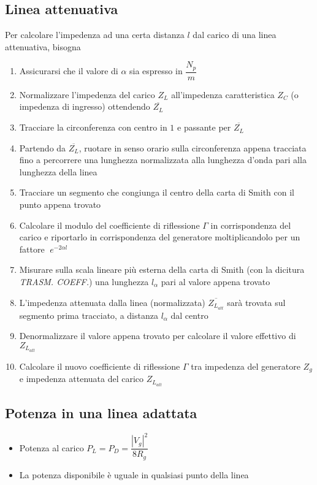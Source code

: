 \documentclass{article}
\begin{document}
\subsection{Linea attenuativa}
Per calcolare l'impedenza ad una certa distanza \(l\) dal carico di una linea attenuativa, bisogna
\begin{enumerate}
	\item Assicurarsi che il valore di \(\alpha\) sia espresso in \(\dfrac{N_p}{m}\)
	\item Normalizzare l'impedenza del carico \(Z_L\) all'impedenza caratteristica \(Z_C\) (o impedenza di ingresso) ottendendo \(\overline{Z_L}\)
	\item Tracciare la circonferenza con centro in \(1\) e passante per \( \overline{Z_L} \)
	\item Partendo da \(\overline{Z_L}\), ruotare in senso orario sulla circonferenza appena tracciata fino a percorrere una lunghezza normalizzata alla lunghezza d'onda pari alla lunghezza della linea
	\item Tracciare un segmento che congiunga il centro della carta di Smith con il punto appena trovato
	\item Calcolare il modulo del coefficiente di riflessione \(\Gamma\) in corrispondenza del carico e riportarlo in corrispondenza del generatore moltiplicandolo per un fattore \(\;e^{-2 \alpha l}\)
	\item Misurare sulla scala lineare più esterna della carta di Smith (con la dicitura \textit{TRASM. COEFF.}) una lunghezza \(l_\alpha\) pari al valore appena trovato
	\item L'impedenza attenuata dalla linea (normalizzata) \(\overline{Z_{L_{att}}}\) sarà trovata sul segmento prima tracciato, a distanza \( l_\alpha\) dal centro
	\item Denormalizzare il valore appena trovato per calcolare il valore effettivo di \( Z_{L_{att}} \)
	\item Calcolare il nuovo coefficiente di riflessione \(\Gamma\) tra impedenza del generatore \(Z_g\) e impedenza attenuata del carico \(Z_{L_{att}}\)
		
\end{enumerate}

\subsection{Potenza in una linea adattata}
\begin{itemize}
	\item Potenza al carico \(P_L = P_D = \dfrac{|V_g|^2}{8 R_g} \)
	\item La potenza disponibile è uguale in qualsiasi punto della linea
\end{itemize}
\end{document}
